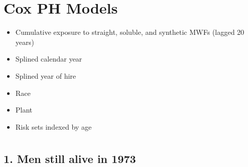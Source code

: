 \documentclass[10pt,]{article}
\providecommand{\tightlist}{%
  \setlength{\itemsep}{0pt}\setlength{\parskip}{0pt}}
\begin{document}
\hypertarget{cox-ph-models}{%
\section{Cox PH Models}\label{cox-ph-models}}

\linespread{1.25}

\begin{itemize}
\tightlist
\item
  Cumulative exposure to straight, soluble, and synthetic MWFs (lagged
  20 years)
\item
  Splined calendar year
\item
  Splined year of hire
\item
  Race
\item
  Plant
\item
  Risk sets indexed by age
\end{itemize}

\hypertarget{section-3}{%
\section{}\label{section-3}}

\hypertarget{men-still-alive-in-1973}{%
\subsection{1. Men still alive in 1973}\label{men-still-alive-in-1973}}
\end{document}
